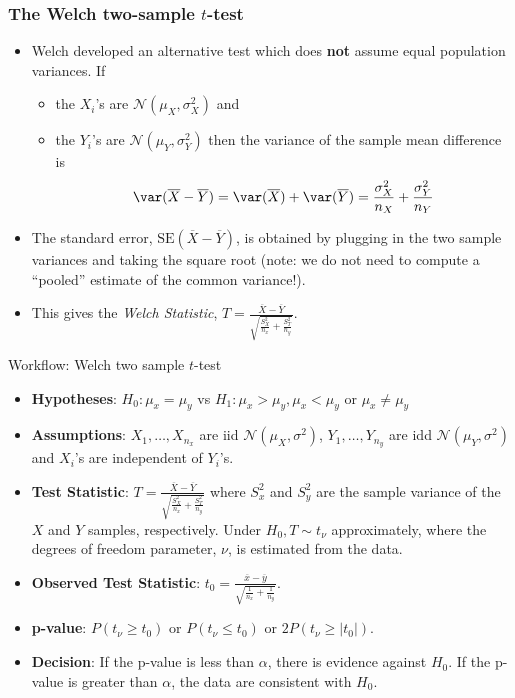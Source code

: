 \documentclass[a4paper]{article}
\begin{document}
\subsubsection{The Welch two-sample \( t \)-test}
\begin{itemize}
	\item Welch developed an alternative test which does \textbf{not} assume equal population variances. If
	\begin{itemize}
		\item the \( X_i \)'s are \( \mathcal{N} (\mu_X,\sigma^2_X) \) and
		\item the \( Y_i \)'s are \( \mathcal{N} (\mu_Y,\sigma^2_Y) \) then the variance of the sample mean difference is
		\[
			\var (\overline{X} - \overline{Y}) = \var(\overline{X}) + \var(\overline{Y}) = \frac{\sigma^2_X}{n_X} + \frac{\sigma^2_Y}{n_Y}
		\]
	\end{itemize}
	\item The standard error, \( \mathrm{SE} (\overline{X} - \overline{Y}) \), is obtained by plugging in the two sample variances and taking the square root (note: we do not need to compute a ``pooled'' estimate of the common variance!).
	\item This gives the \textit{Welch Statistic}, \( T = \frac{\overline{X} - \overline{Y}}{\sqrt{\frac{S^2_X}{n_x}+\frac{S^2_T}{n_y}}} \). 
\end{itemize}
\begin{redbox}{Workflow: Welch two sample \( t \)-test}
	\begin{itemize}
		\item \textbf{Hypotheses}: \( H_0: \mu_x = \mu_y \) vs \( H_1: \mu_x > \mu_y, \mu_x < \mu_y \) or \( \mu_x \neq \mu_y \)
		\item \textbf{Assumptions}: \( X_1,\dots,X_{n_x} \) are iid \( \mathcal{N} (\mu_X,\sigma^2) \), \( Y_1,\dotsc,Y_{n_y} \) are idd \( \mathcal{N} (\mu_Y,\sigma^2) \) and \( X_i \)'s are independent of \( Y_i \)'s.
		\item \textbf{Test Statistic}: \( T = \frac{\overline{X} - \overline{Y}}{\sqrt{\frac{S^2_X}{n_x}+\frac{S^2_T}{n_y}}} \) where \( S^2_x \) and \( S^2_y \) are the sample variance of the \( X \) and \( Y \) samples, respectively. Under \( H_0, T \sim t_\nu \) approximately, where the degrees of freedom parameter, \( \nu \), is estimated from the data.
		\item \textbf{Observed Test Statistic}: \( t_0 = \frac{\overline{x} - \overline{y}}{\sqrt{\frac{1}{n_x}+\frac{1}{n_y}}} \).
		\item \textbf{p-value}: \( P(t_\nu \geq t_0) \) or \( P(t_\nu \leq t_0) \) or \( 2P(t_\nu \geq \lvert t_0 \rvert) \).
		\item \textbf{Decision}: If the p-value is less than \( \alpha \), there is evidence against \( H_0 \). If the p-value is greater than \( \alpha \), the data are consistent with \( H_0 \).
	\end{itemize}
\end{redbox}
\end{document}
